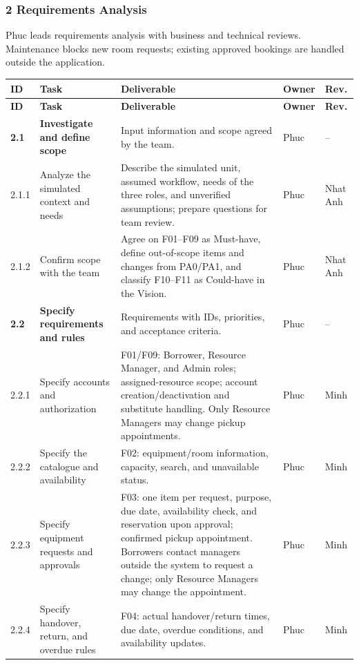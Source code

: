 \documentclass[11pt]{article}
\renewcommand{\arraystretch}{1.18}
\begin{document}
\subsubsection*{2 Requirements Analysis}
Phuc leads requirements analysis with business and technical reviews. Maintenance blocks new room requests; existing approved bookings are handled outside the application.
\footnotesize\setlength{\tabcolsep}{2.5pt}\renewcommand{\arraystretch}{1.08}
\begin{longtable}{@{}L{1.15cm}L{3.2cm}L{7.6cm}L{1.4cm}L{1.4cm}@{}}
\toprule
\textbf{ID} & \textbf{Task} & \textbf{Deliverable} & \textbf{Owner} & \textbf{Rev.} \\
\midrule\endfirsthead\toprule
\textbf{ID} & \textbf{Task} & \textbf{Deliverable} & \textbf{Owner} & \textbf{Rev.} \\
\midrule\endhead
\textbf{2.1} & \textbf{Investigate and define scope} & Input information and scope agreed by the team. & Phuc & -- \\
2.1.1 & Analyze the simulated context and needs & Describe the simulated unit, assumed workflow, needs of the three roles, and unverified assumptions; prepare questions for team review. & Phuc & Nhat Anh \\
2.1.2 & Confirm scope with the team & Agree on F01--F09 as Must-have, define out-of-scope items and changes from PA0/PA1, and classify F10--F11 as Could-have in the Vision. & Phuc & Nhat Anh \\
\textbf{2.2} & \textbf{Specify requirements and rules} & Requirements with IDs, priorities, and acceptance criteria. & Phuc & -- \\
2.2.1 & Specify accounts and authorization & F01/F09: Borrower, Resource Manager, and Admin roles; assigned-resource scope; account creation/deactivation and substitute handling. Only Resource Managers may change pickup appointments. & Phuc & Minh \\
2.2.2 & Specify the catalogue and availability & F02: equipment/room information, capacity, search, and unavailable status. & Phuc & Minh \\
2.2.3 & Specify equipment requests and approvals & F03: one item per request, purpose, due date, availability check, and reservation upon approval; confirmed pickup appointment. Borrowers contact managers outside the system to request a change; only Resource Managers may change the appointment. & Phuc & Minh \\
2.2.4 & Specify handover, return, and overdue rules & F04: actual handover/return times, due date, overdue conditions, and availability updates. & Phuc & Minh \\

\end{longtable}
\end{document}
